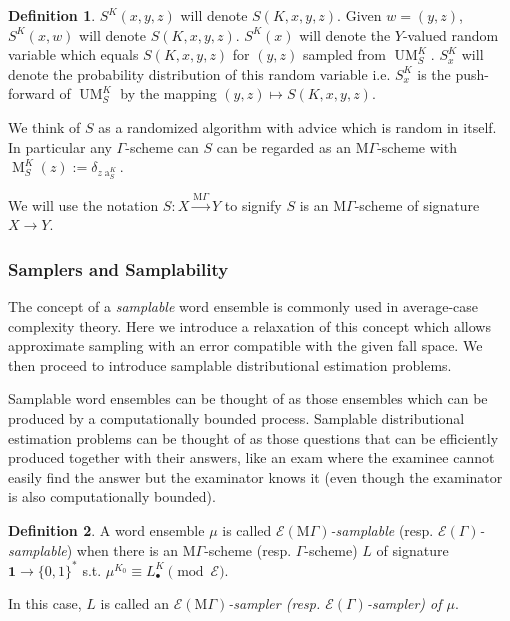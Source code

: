 \documentclass{article}
\numberwithin{equation}{section}
\theoremstyle{definition}
\newtheorem{definition}{Definition}[section]
\theoremstyle{plain}
\newcommand{\Bool}{\{0,1\}}
\newcommand{\Words}{{\Bool^*}}
\DeclareMathOperator{\A}{a}
\DeclareMathOperator{\M}{M}
\DeclareMathOperator{\UM}{UM}
\newcommand{\MGrow}{\mathrm{M}\Gamma}
\newcommand{\Fall}{\mathcal{E}}
\newcommand{\EG}{\Fall(\Gamma)}
\newcommand{\EMG}{\Fall(\MGrow)}
\newcommand{\MScheme}{\xrightarrow{\MGrow}}
\begin{document}
\begin{samepage}
\begin{definition}
$S^K(x,y,z)$ will denote $S(K,x,y,z)$. Given $w=(y,z)$, $S^K(x,w)$ will denote $S(K,x,y,z)$. $S^K(x)$ will denote the $Y$-valued random variable which equals $S(K,x,y,z)$ for $(y,z)$ sampled from $\UM_S^K$. $S_x^K$ will denote the probability distribution of this random variable i.e. $S_x^K$ is the push-forward of $\UM_S^K$ by the mapping $(y,z) \mapsto S(K,x,y,z)$.

We think of $S$ as a randomized algorithm with advice which is random in itself. In particular any $\Gamma$-scheme can $S$ can be regarded as an $\MGrow$-scheme with $\M_S^K(z):=\delta_{z\A_S^K}$.

We will use the notation $S: X \MScheme Y$ to signify $S$ is an $\MGrow$-scheme of signature $X \rightarrow Y$.

\end{definition}
\end{samepage}

\subsubsection{Samplers and Samplability}

The concept of a \emph{samplable} word ensemble is commonly used in average-case complexity theory. Here we introduce a relaxation of this concept which allows approximate sampling with an error compatible with the given fall space. We then proceed to introduce samplable distributional estimation problems.

Samplable word ensembles can be thought of as those ensembles which can be produced by a computationally bounded process. Samplable distributional estimation problems can be thought of as those questions that can be efficiently produced together with their answers, like an exam where the examinee cannot easily find the answer but the examinator knows it (even though the examinator is also computationally bounded).

\begin{samepage}
\begin{definition}

A word ensemble $\mu$ is called \emph{$\EMG$-samplable} (resp. \emph{$\EG$-samplable}) when there is an $\MGrow$-scheme (resp. $\Gamma$-scheme) $L$ of signature ${\bm{1} \rightarrow \Words}$  s.t. $\mu^{K_0} \equiv L_\bullet^K \pmod \Fall$.

In this case, $L$ is called an \emph{$\EMG$-sampler (resp. $\EG$-sampler) of $\mu$}.

\end{definition}
\end{samepage}
\end{document}
